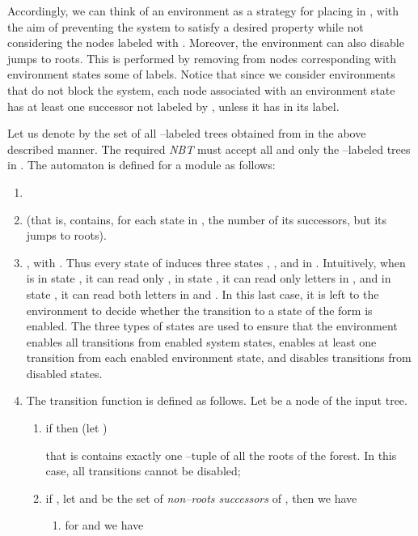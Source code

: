 \documentclass{LMCS}
\theoremstyle{plain}
\def \NBT           {\emph{NBT}\xspace}
\begin{document}
Accordingly, we can think of an environment as a strategy for placing
 in , with the aim of preventing the system
to satisfy a desired property while not considering the nodes labeled with
. Moreover, the environment can also disable jumps to roots. This is
performed by removing from nodes corresponding with environment states some of
 labels. Notice that since we consider environments that
do not block the system, each node associated with an environment state has at
least one successor not labeled by , unless it has
 in its label.

Let us denote by  the set of all --labeled  trees obtained from
 in the above described manner. The required
\NBT  must accept all and only the --labeled trees in . The automaton
 is defined for a module   as follows:
\begin{enumerate}[]
    \item
    

    \item
     (that is,  contains, for
    each state in , the number of its successors, but its jumps to roots).

    \item
    , with . Thus
    every state  of  induces three states , , and
     in . Intuitively, when  is in state ,
    it can read only , in state , it can read only letters in
    , and in state , it can read both letters in
     and . In this last case, it is left to the environment
    to decide whether the transition to a state of the form  is
    enabled. The three types of states are used to ensure that the environment
    enables all transitions from enabled system states, enables at least one
    transition from each enabled environment state, and disables transitions from
    disabled states.

    \item
    The transition function  is defined as follows. Let  be a
    node of the input tree.
    \begin{enumerate}[]
    \item
    if  then (let )
        
    that is  contains exactly one --tuple of all
    the roots of the forest. In this case, all transitions cannot be
    disabled;

    \item
    if , let  and  be the set of
    \emph{non--roots successors} of , then we have

\begin{enumerate}[]
\item
for  and  we have
    

\end{enumerate}
\end{enumerate}
\end{enumerate}
\end{document}
